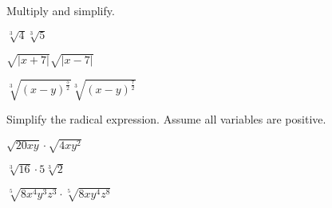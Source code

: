 \newpage

\begin{exercise}
	Multiply and simplify.\\
	\begin{enumerate*}[label={(\arabic*)~}]
		\item $\sqrt[3]{4}\sqrt[3]{5}$
		\item $\sqrt{|x+7|}\sqrt{|x-7|}$
		\item $\sqrt[3]{(x-y)^{\frac52}}\sqrt[3]{(x-y)^{\frac72}}$ 
		\hfill\null
	\end{enumerate*}
\end{exercise}

\vfill
\begin{center} \hfill
\end{center}


\begin{exercise}Simplify the radical expression. Assume all variables are positive. \\
	\begin{enumerate*}[label={(\arabic*)~}]
		\item $\sqrt{20xy}\cdot\sqrt{4xy^2}$
		\item $\sqrt[3]{16}\cdot5\sqrt[3]{2}$
		\item $\sqrt[5]{8x^4y^3z^3}\cdot\sqrt[5]{8xy^4z^8}$
		\hfill\null
	\end{enumerate*}
\end{exercise}

\vfill
\begin{center} \hfill
\end{center}


